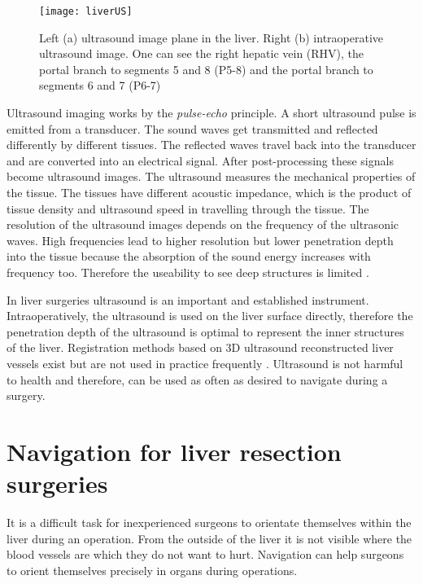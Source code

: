 \begin{figure}[H]
  \centering
 \texttt{[image: liverUS]}
 \caption{ Left (a) ultrasound image plane in the liver. Right (b) intraoperative
   ultrasound image. One can see the right hepatic vein (RHV), the portal branch
   to segments 5 and 8 (P5-8) and the portal branch to segments 6 and 7 (P6-7) \cite{torzilli2014ultrasound}}
  \label{fig:liverUS}
\end{figure}

Ultrasound imaging works by the \textit{pulse-echo} principle. A short
ultrasound pulse is emitted from a transducer. The sound waves get
transmitted and reflected differently by different tissues. The reflected
 waves travel back into the transducer and are converted into an electrical
signal. After post-processing these signals become ultrasound images. 
The ultrasound measures the mechanical properties of the tissue. The tissues
have different acoustic impedance, which is the product of tissue density and
ultrasound speed in travelling through the tissue. The resolution of the
ultrasound images depends on the frequency of the ultrasonic waves. High
frequencies lead to higher resolution but lower penetration depth into the tissue because the
absorption of the sound energy increases with frequency too. Therefore the
useability to see deep structures is limited \cite{torzilli2014ultrasound}. 

In liver surgeries ultrasound is an important and established instrument.
Intraoperatively, the ultrasound is used on the liver surface directly,
therefore the penetration depth of the
ultrasound is optimal to represent the inner structures of the liver.
Registration methods based on 3D ultrasound reconstructed liver vessels 
exist but are not used in practice frequently \cite{lange2003vessel}. Ultrasound
is not harmful to health and therefore, can
be used as often as desired to navigate during a surgery.

\section{Navigation for liver resection surgeries}
\label{sec:navigationForLiverResections}
It is a difficult task for inexperienced surgeons to orientate themselves within the liver during an operation.
From the outside of the liver it is not visible where the blood vessels are which they do not want to hurt.
Navigation can help surgeons to orient themselves precisely in organs during
operations.

